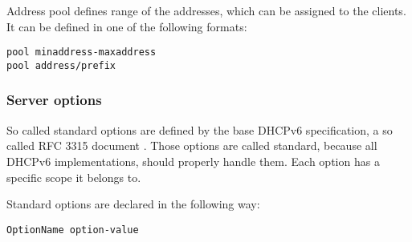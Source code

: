 Address pool defines range of the addresses, which can be assigned to the
clients. It can be defined in one of the following formats:
\begin{lstlisting}
pool minaddress-maxaddress
pool address/prefix
\end{lstlisting}

\subsubsection{Server options}

So called standard options are defined by the base DHCPv6 specification,
a so called RFC 3315 document \cite{rfc3315}. Those options are
called standard, because all DHCPv6 implementations, should properly
handle them. Each option has a specific scope it belongs to.

Standard options are declared in the following way:

\begin{lstlisting}
OptionName option-value
\end{lstlisting}

